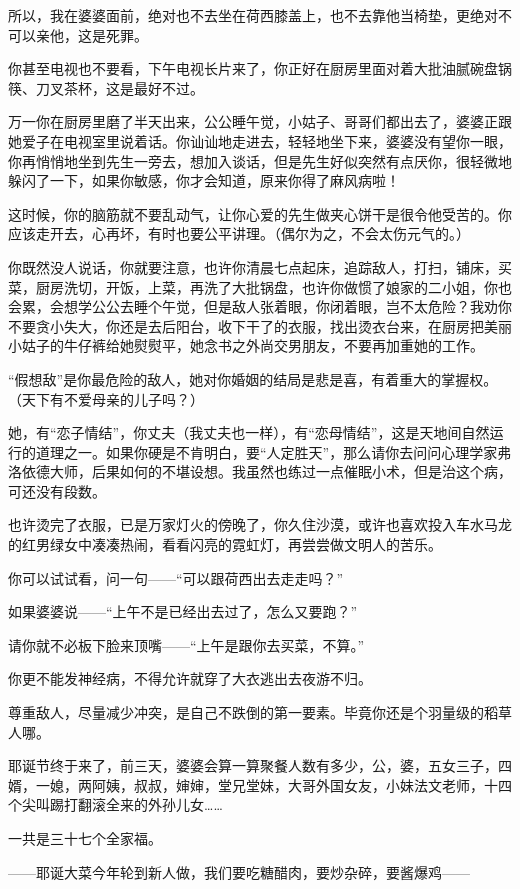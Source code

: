 \par 所以，我在婆婆面前，绝对也不去坐在荷西膝盖上，也不去靠他当椅垫，更绝对不可以亲他，这是死罪。
\par 你甚至电视也不要看，下午电视长片来了，你正好在厨房里面对着大批油腻碗盘锅筷、刀叉茶杯，这是最好不过。
\par 万一你在厨房里磨了半天出来，公公睡午觉，小姑子、哥哥们都出去了，婆婆正跟她爱子在电视室里说着话。你讪讪地走进去，轻轻地坐下来，婆婆没有望你一眼，你再悄悄地坐到先生一旁去，想加入谈话，但是先生好似突然有点厌你，很轻微地躲闪了一下，如果你敏感，你才会知道，原来你得了麻风病啦！
\par 这时候，你的脑筋就不要乱动气，让你心爱的先生做夹心饼干是很令他受苦的。你应该走开去，心再坏，有时也要公平讲理。（偶尔为之，不会太伤元气的。）
\par 你既然没人说话，你就要注意，也许你清晨七点起床，追踪敌人，打扫，铺床，买菜，厨房洗切，开饭，上菜，再洗了大批锅盘，也许你做惯了娘家的二小姐，你也会累，会想学公公去睡个午觉，但是敌人张着眼，你闭着眼，岂不太危险？我劝你不要贪小失大，你还是去后阳台，收下干了的衣服，找出烫衣台来，在厨房把美丽小姑子的牛仔裤给她熨熨平，她念书之外尚交男朋友，不要再加重她的工作。
\par “假想敌”是你最危险的敌人，她对你婚姻的结局是悲是喜，有着重大的掌握权。（天下有不爱母亲的儿子吗？）
\par 她，有“恋子情结”，你丈夫（我丈夫也一样），有“恋母情结”，这是天地间自然运行的道理之一。如果你硬是不肯明白，要“人定胜天”，那么请你去问问心理学家弗洛依德大师，后果如何的不堪设想。我虽然也练过一点催眠小术，但是治这个病，可还没有段数。
\par 也许烫完了衣服，已是万家灯火的傍晚了，你久住沙漠，或许也喜欢投入车水马龙的红男绿女中凑凑热闹，看看闪亮的霓虹灯，再尝尝做文明人的苦乐。
\par 你可以试试看，问一句——“可以跟荷西出去走走吗？”
\par 如果婆婆说——“上午不是已经出去过了，怎么又要跑？”
\par 请你就不必板下脸来顶嘴——“上午是跟你去买菜，不算。”
\par 你更不能发神经病，不得允许就穿了大衣逃出去夜游不归。
\par 尊重敌人，尽量减少冲突，是自己不跌倒的第一要素。毕竟你还是个羽量级的稻草人哪。
\par 耶诞节终于来了，前三天，婆婆会算一算聚餐人数有多少，公，婆，五女三子，四婿，一媳，两阿姨，叔叔，婶婶，堂兄堂妹，大哥外国女友，小妹法文老师，十四个尖叫踢打翻滚全来的外孙儿女……
\par 一共是三十七个全家福。
\par ——耶诞大菜今年轮到新人做，我们要吃糖醋肉，要炒杂碎，要酱爆鸡——
